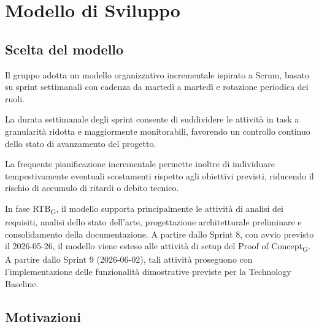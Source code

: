 \section{Modello di Sviluppo}

\subsection{Scelta del modello}

Il gruppo adotta un modello organizzativo incrementale ispirato a Scrum,
basato su sprint settimanali con cadenza da martedì a martedì e rotazione
periodica dei ruoli.

La durata settimanale degli sprint consente di suddividere le attività in task
a granularità ridotta e maggiormente monitorabili, favorendo un controllo
continuo dello stato di avanzamento del progetto.

La frequente pianificazione incrementale permette inoltre di individuare
tempestivamente eventuali scostamenti rispetto agli obiettivi previsti,
riducendo il rischio di accumulo di ritardi o debito tecnico.

In fase RTB\textsubscript{G}, il modello supporta principalmente le attività di
analisi dei requisiti, analisi dello stato dell'arte, progettazione architetturale
preliminare e consolidamento della documentazione. A partire dallo Sprint 8, con avvio previsto il 2026-05-26, il modello viene
esteso alle attività di setup del Proof of Concept\textsubscript{G}. A partire dallo Sprint 9 (2026-06-02),
tali attività proseguono con l'implementazione delle funzionalità dimostrative
previste per la Technology Baseline.

\subsection{Motivazioni}

